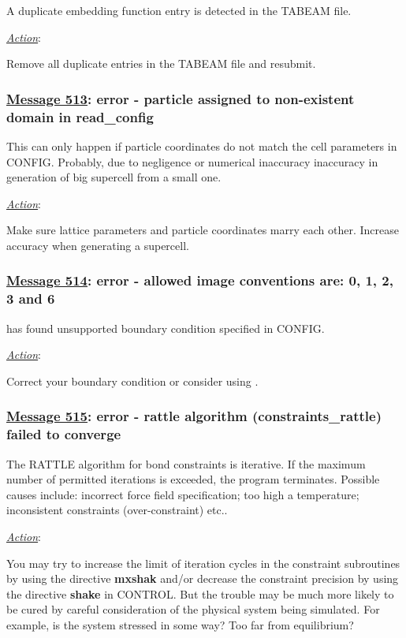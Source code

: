 A duplicate embedding function entry is detected
in the TABEAM file.

\noindent \underline{\em Action}:

Remove all duplicate entries in the TABEAM file and resubmit.

\subsubsection*{\underline{Message 513}: error - particle assigned to non-existent domain in read\_config}

This can only happen if particle coordinates do not match the cell
parameters in CONFIG.  Probably, due to negligence or numerical
inaccuracy inaccuracy in generation of big supercell from a small
one.

\noindent \underline{\em Action}:

Make sure lattice parameters and particle coordinates marry each
other.  Increase accuracy when generating a supercell.

\subsubsection*{\underline{Message 514}: error - allowed image conventions are: 0, 1, 2, 3 and 6}

\D has found unsupported boundary condition specified in CONFIG.

\noindent \underline{\em Action}:

Correct your boundary condition or consider using \C.

\subsubsection*{\underline{Message 515}: error - rattle algorithm (constraints\_rattle) failed to converge}

The RATTLE algorithm for bond
constraints is iterative.  If the maximum
number of permitted iterations is exceeded, the program
terminates.  Possible causes include: incorrect force
field specification; too high a temperature;
inconsistent constraints (over-constraint) etc..

\noindent \underline{\em Action}:

You may try to increase the limit of iteration cycles in the
constraint subroutines by using the directive {\bf mxshak} and/or
decrease the constraint precision by using the directive {\bf shake}
in CONTROL.  But the trouble may be much more likely to be cured by
careful consideration of the physical system being simulated.  For
example, is the system stressed in some way? Too far from
equilibrium?


